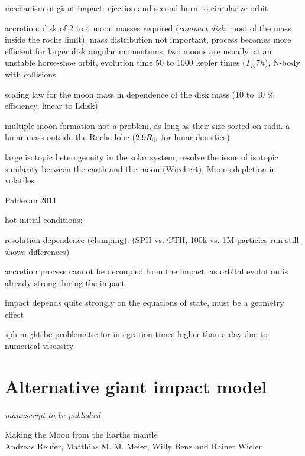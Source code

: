 mechanism of giant impact: ejection and second burn to circularize orbit

accretion:
\citep{Kokubo:2000p2195}
disk of 2 to 4 moon masses required (\emph{compact disk}, most of the mass inside the roche limit), mass distribution not important, process becomes more efficient for larger disk angular momentums, two moons are usually on an unstable horse-shoe orbit, evolution time 50 to 1000 kepler times ($T_K 7h$), N-body with collisions

\citep{Ida:1997p3395} scaling law for the moon mass in dependence of the disk mass (10 to 40 \% efficiency, linear to Ldisk)

\cite{Canup:1996p3541} multiple moon formation not a problem, as long as their size sorted on radii. a lunar mass outside the Roche lobe ($2.9 R_{\oplus}$ for lunar densities).

\citep{Pahlevan:2007p2065}
large isotopic heterogeneity in the solar system, resolve the issue of isotopic similarity between the earth and the moon (Wiechert), Moons depletion in volatiles


\cite{2011E&PSL.301..433P} Pahlevan 2011

hot initial conditions:
\citep{2000orem.book..179P}

resolution dependence (clumping):
\citep{Canup:2010p3713} (SPH vs. CTH, 100k vs. 1M particles run still shows differences)


accretion process cannot be decoupled from the impact, as orbital evolution is already strong during the impact 

impact depends quite strongly on the equations of state, must be a geometry effect

sph might be problematic for integration times higher than a day due to numerical viscosity \citep{Canup:2004p115} 


\section{Alternative giant impact model}




\clearpage
\thispagestyle{empty}
\begin{flushright} \emph{manuscript to be published} \end{flushright}
{\Large Making the Moon from the Earths mantle} \vspace{0.5cm}\\
Andreas Reufer, Matthias M. M. Meier, Willy Benz and Rainer Wieler\\

